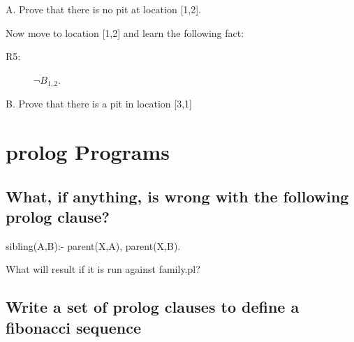 \documentclass[]{article}
\begin{document}
A.  Prove that there is no pit at location [1,2].

\vspace{1in}
Now move to location [1,2] and learn the following fact:
\begin{description}
\item[R5:] $\neg B_{1,2}$.
\end{description}

B.  Prove that there is a pit in location [3,1]

\newpage
\section{prolog Programs}
\subsection{What, if anything, is wrong with the following prolog clause?}
sibling(A,B):- parent(X,A), parent(X,B).
\vspace{5mm}

  What will result if it is run against family.pl?
\vspace{1in}



\subsection{Write a set of prolog clauses to define a fibonacci sequence}
\end{document}
